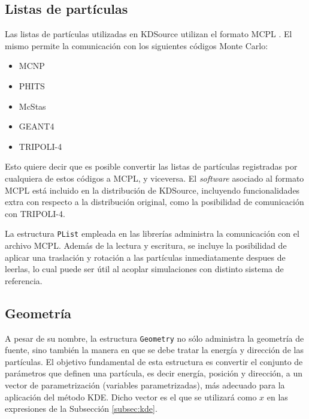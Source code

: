 \subsection{Listas de partículas}

Las listas de partículas utilizadas en KDSource utilizan el formato MCPL \cite{MCPL}. El mismo permite la comunicación con los siguientes códigos Monte Carlo:
\begin{itemize}
	\item MCNP
	\item PHITS
	\item McStas
	\item GEANT4
	\item TRIPOLI-4
\end{itemize}
Esto quiere decir que es posible convertir las listas de partículas registradas por cualquiera de estos códigos a MCPL, y viceversa. El \emph{software} asociado al formato MCPL está incluido en la distribución de KDSource, incluyendo funcionalidades extra con respecto a la distribución original, como la posibilidad de comunicación con TRIPOLI-4.

La estructura \verb|PList| empleada en las librerías administra la comunicación con el archivo MCPL. Además de la lectura y escritura, se incluye la posibilidad de aplicar una traslación y rotación a las partículas inmediatamente despues de leerlas, lo cual puede ser útil al acoplar simulaciones con distinto sistema de referencia.

\subsection{Geometría}

A pesar de su nombre, la estructura \verb|Geometry| no sólo administra la geometría de fuente, sino también la manera en que se debe tratar la energía y dirección de las partículas. El objetivo fundamental de esta estructura es convertir el conjunto de parámetros que definen una partícula, es decir energía, posición y dirección, a un vector de parametrización (variables parametrizadas), más adecuado para la aplicación del método KDE. Dicho vector es el que se utilizará como $x$ en las expresiones de la Subsección \ref{subsec:kde}.


